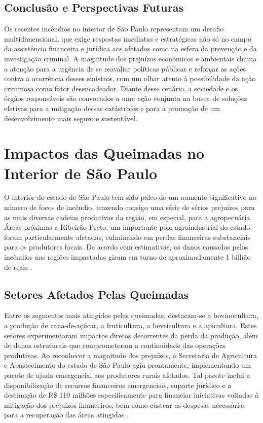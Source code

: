 \documentclass[
   article,       
   12pt,          
   oneside,       
   a4paper,       
   english,       
   brazil,        
   sumario=tradicional
   ]{abntex2}
\begin{document}
\subsection{Conclusão e Perspectivas Futuras}

Os recentes incêndios no interior de São Paulo representam um desafio multidimensional, que exige respostas imediatas e estratégicas não só no campo da assistência financeira e jurídica aos afetados como na esfera da prevenção e da investigação criminal. A magnitude dos prejuízos econômicos e ambientais chama a atenção para a urgência de se reavaliar políticas públicas e reforçar as ações contra a ocorrência desses sinistros, com um olhar atento à possibilidade da ação criminosa como fator desencadeador. Diante desse cenário, a sociedade e os órgãos responsáveis são convocados a uma ação conjunta na busca de soluções efetivas para a mitigação dessas catástrofes e para a promoção de um desenvolvimento mais seguro e sustentável.
\section{Impactos das Queimadas no Interior de São Paulo}
O interior do estado de São Paulo tem sido palco de um aumento significativo no número de focos de incêndio, trazendo consigo uma série de sérios prejuízos para as mais diversas cadeias produtivas da região, em especial, para a agropecuária. Áreas próximas a Ribeirão Preto, um importante polo agroindustrial do estado, foram particularmente afetadas, culminando em perdas financeiras substanciais para os produtores locais. De acordo com estimativas, os danos causados pelos incêndios nas regiões impactadas giram em torno de aproximadamente 1 bilhão de reais \cite{Queimadas_em_SP_causaram_prejuizo_de_R_1_bi_a}.

\subsection{Setores Afetados Pelas Queimadas}
Entre os segmentos mais atingidos pelas queimadas, destacam-se a bovinocultura, a produção de cana-de-açúcar, a fruticultura, a heveicultura e a apicultura. Estes setores experimentaram impactos diretos decorrentes da perda da produção, além de danos estruturais que comprometeram a continuidade das operações produtivas. Ao reconhecer a magnitude dos prejuízos, a Secretaria de Agricultura e Abastecimento do estado de São Paulo agiu prontamente, implementando um pacote de ajuda emergencial aos produtores rurais afetados. Tal pacote inclui a disponibilização de recursos financeiros emergenciais, suporte jurídico e a destinação de R\$ 110 milhões especificamente para financiar iniciativas voltadas à mitigação dos prejuízos financeiros, bem como custear as despesas necessárias para a recuperação das áreas atingidas \cite{Semana_de_queimadas_teve_saltos_de_338_em_SP_}.
\end{document}
